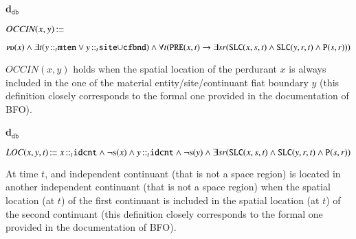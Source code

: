 \documentclass[ao]{iosart2x}
\newcommand{\nb}[1]{\textcolor{red}{$|$}\marginpar{\hspace*{-0cm}\parbox{20mm}{\scriptsize\raggedright\textcolor{red}{#1}}}}
\newcommand{\bfoDefLabel}{\textrm{d$_\texttt{b}$}}
\newcommand{\dbDefLabel}{\textrm{d$_\texttt{db}$}}
\newcounter{cntdbdf}
\newcommand{\dbdf}[1]{\refstepcounter{cntdbdf}\begin{small}{\bf \dbDefLabel\thecntdbdf\label{#1}}\end{small}}
\newcommand{\refbfodf}[1]{({\bfoDefLabel}\ref{#1})}
\newcommand{\pr}[1]{\mathtt{#1}}
\newcommand{\prbfo}[1]{{\textit{{#1}}}}
\newcommand{\cn}[1]{\mathtt{#1}}
\newcommand\textequal{%
 \rule[.08ex]{5pt}{0.35pt}\llap{\rule[.78ex]{5pt}{0.35pt}}}
\newcommand{\sdef}{{\hspace{1.5pt}:\hspace{-2.5pt}\textequal\hspace{3pt}}}
\newcommand{\dolce}{{\textsc{dolce}}}
\newcommand {\PDdcat} {\textsc{pd}}
\newcommand {\Sdcat} {\textsc{s}}
\newcommand {\Pd} {\ensuremath{\pr{P}}}
\newcommand {\PREd} {\ensuremath{\pr{PRE}}}
\newcommand {\SLCd} {\ensuremath{\pr{SLC}}}
\newcommand{\idcntbcat}{\cn{idcnt}}
\newcommand{\mtenbcat}{\cn{mten}}
\newcommand{\sitebcat}{\cn{site}}
\newcommand{\cfbndbcat}{\cn{cfbnd}}
\newcommand{\bfoiof}[1]{{\,::_{#1\:\!}}}
\newcommand{\bfooccurs}{\prbfo{OCCIN}}
\newcommand{\bfolocated}{\prbfo{LOC}}
\begin{document}
\item[\dbdf{d2b_occurs}] $\bfooccurs(x,y) \sdef $\parbox[t]{\textwidth}{$\PDdcat(x) \land \exists t(y \bfoiof{t} \mtenbcat \lor y \bfoiof{t} \sitebcat{\cup}\cfbndbcat) \land \\ 
\forall t(\PREd(x,t) \to \exists sr(\SLCd(x,s,t) \land \SLCd(y,r,t) \land \Pd(s,r)))$}

\vspace{1pt}
$\bfooccurs(x,y)$ holds when the spatial location of the perdurant $x$ is always included in the one of the material entity/site/continuant fiat boundary $y$ (this definition closely corresponds to the formal one provided in the documentation of BFO).


\item[\dbdf{d2b_located}] $\bfolocated(x,y,t) \sdef x \bfoiof{t} \idcntbcat \land \neg\Sdcat(x) \land y \bfoiof{t} \idcntbcat \land \neg\Sdcat(y) \land
\exists sr(\SLCd(x,s,t) \land \SLCd(y,r,t) \land \Pd(s,r))$

\vspace{1pt}
At time $t$, and independent continuant (that is not a space region) is located in another independent continuant (that is not a space region) when the spatial location (at $t$) of the first continuant is included in the spatial location (at $t$) of the second continuant (this definition closely corresponds to the formal one provided in the documentation of BFO).%

%
\end{document}
